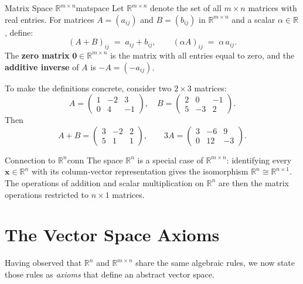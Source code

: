 \documentclass[12pt,a4paper]{article}
\newcommand{\R}{\mathbb{R}}
\newcommand{\vv}[1]{\mathbf{#1}}
\newcommand{\vzero}{\mathbf{0}}
\begin{document}
\begin{definition}{Matrix Space $\R^{m\times n}$}{matspace}
  Let $\R^{m\times n}$ denote the set of all $m \times n$ matrices with real entries.
  For matrices $A = (a_{ij})$ and $B = (b_{ij})$ in $\R^{m\times n}$ and a scalar
  $\alpha \in \R$, define:
  \[
    (A + B)_{ij} \;=\; a_{ij} + b_{ij},
    \qquad
    (\alpha A)_{ij} \;=\; \alpha\, a_{ij}.
  \]
  The \textbf{zero matrix} $\vzero \in \R^{m\times n}$ is the matrix with all entries
  equal to zero, and the \textbf{additive inverse} of $A$ is $-A = (-a_{ij})$.
\end{definition}

\noindent
To make the definitions concrete, consider two $2\times 3$ matrices:
\[
  A = \begin{pmatrix} 1 & -2 & 3 \\ 0 & 4 & -1 \end{pmatrix},
  \quad
  B = \begin{pmatrix} 2 & 0 & -1 \\ 5 & -3 & 2 \end{pmatrix}.
\]
Then
\[
  A + B
  = \begin{pmatrix} 3 & -2 & 2 \\ 5 & 1 & 1 \end{pmatrix},
  \qquad
  3A
  = \begin{pmatrix} 3 & -6 & 9 \\ 0 & 12 & -3 \end{pmatrix}.
\]

\begin{remark}{Connection to $\R^n$}{conn}
  The space $\R^n$ is a special case of $\R^{m\times n}$: identifying every
  $\vv{x}\in\R^n$ with its column-vector representation gives the isomorphism
  $\R^n \cong \R^{n\times 1}$.  The operations of addition and scalar
  multiplication on $\R^n$ are then the matrix operations restricted to
  $n\times 1$ matrices.
\end{remark}

\section{The Vector Space Axioms}

\noindent
Having observed that $\R^n$ and $\R^{m\times n}$ share the same algebraic rules,
we now state those rules as \emph{axioms} that define an abstract vector space.
\end{document}
